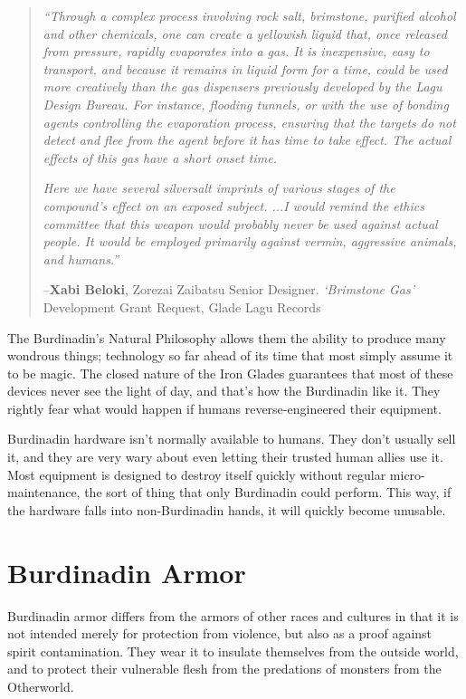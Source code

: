\documentclass[oneside,11pt,english]{book}
\begin{document}
\begin{quote}
\emph{“Through a complex process involving rock salt, brimstone, purified alcohol and other chemicals, one can create a yellowish 
liquid that, once released from pressure, rapidly evaporates into a gas. It is inexpensive, easy to transport, and because it 
remains in liquid form for a time, could be used more creatively than the gas dispensers previously developed by the Lagu Design 
Bureau. For instance, flooding tunnels, or with the use of bonding agents controlling the evaporation process, ensuring that the 
targets do not detect and flee from the agent before it has time to take effect. The actual effects of this gas have a short onset time.}

\emph{Here we have several silversalt imprints of various stages of the compound’s effect on an exposed subject. 
...I would remind the ethics committee that this weapon would probably never be used against actual people. It would be 
employed primarily against vermin, aggressive animals, and humans.”}\par
--\textbf{Xabi Beloki}, Zorezai Zaibatsu Senior Designer. \textit{‘Brimstone Gas’} Development Grant Request, Glade Lagu Records 
\end{quote}

The Burdinadin’s Natural Philosophy allows them the ability to produce many wondrous things; 
technology so far ahead of its time that most simply assume it to be magic. The closed nature of the Iron 
Glades guarantees that most of these devices never see the light of day, and that’s how the Burdinadin 
like it. They rightly fear what would happen if humans reverse-engineered their equipment.

Burdinadin hardware isn’t normally available to humans. They don’t usually sell it, and they are very 
wary about even letting their trusted human allies use it. Most equipment is designed to destroy itself 
quickly without regular micro-maintenance, the sort of thing that only Burdinadin could perform. This 
way, if the hardware falls into non-Burdinadin hands, it will quickly become unusable. 

\section{Burdinadin Armor}
Burdinadin armor differs from the armors of other races and cultures in that it is not intended merely for 
protection from violence, but also as a proof against spirit contamination. They wear it to insulate 
themselves from the outside world, and to protect their vulnerable flesh from the predations of monsters 
from the Otherworld. 
\end{document}
